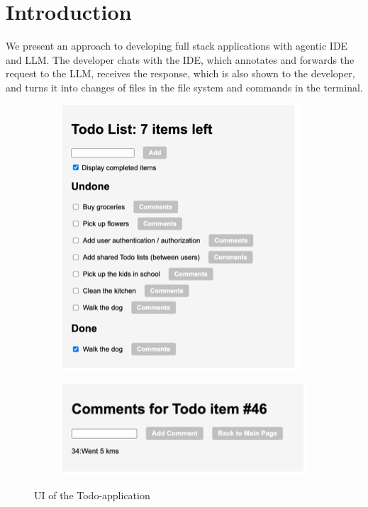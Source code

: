 \documentclass[runningheads]{llncs}
\begin{document}
\section{Introduction}
We present an approach to developing full stack applications with agentic IDE and LLM. The developer chats with the IDE, which annotates and forwards the request to the LLM, receives the response, which is also shown to the developer, and turns it into changes of files in the file system and commands in the terminal.
\begin{figure}[h]
    \centering
    \begin{subfigure}{0.38\textwidth}
        \centering
        \includegraphics[width=\textwidth]{Pictures/Picture1.jpg}
    \end{subfigure}%
    \begin{subfigure}{0.38\textwidth}
        \centering
        \includegraphics[width=\textwidth]{Pictures/Picture2.jpg}
    \end{subfigure}
    \caption{UI of the Todo-application}
    \label{fig:todo}
\end{figure}
\end{document}
